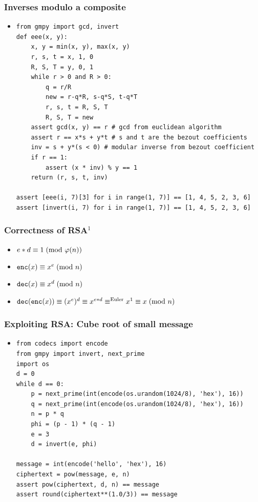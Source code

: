 \documentclass{beamer}
\begin{document}
\begin{frame}[fragile]
\frametitle{Inverses modulo a composite}
\begin{itemize}
\item \begin{Verbatim}[fontsize=\scriptsize]
from gmpy import gcd, invert
def eee(x, y):
    x, y = min(x, y), max(x, y)
    r, s, t = x, 1, 0
    R, S, T = y, 0, 1
    while r > 0 and R > 0:
        q = r/R
        new = r-q*R, s-q*S, t-q*T
        r, s, t = R, S, T
        R, S, T = new
    assert gcd(x, y) == r # gcd from euclidean algorithm
    assert r == x*s + y*t # s and t are the bezout coefficients
    inv = s + y*(s < 0) # modular inverse from bezout coefficient
    if r == 1:
        assert (x * inv) % y == 1
    return (r, s, t, inv)

assert [eee(i, 7)[3] for i in range(1, 7)] == [1, 4, 5, 2, 3, 6]
assert [invert(i, 7) for i in range(1, 7)] == [1, 4, 5, 2, 3, 6]
\end{Verbatim}
\end{itemize}
\end{frame}

\begin{frame}[fragile]
\frametitle{Correctness of RSA$^{1}$}
\begin{itemize}
\item $e * d \equiv 1\hspace{1mm}(\text{mod } \varphi(n))$
\item $\verb|enc|(x) \equiv x^e\hspace{1mm}(\text{mod }n)$
\item $\verb|dec|(x) \equiv x^d\hspace{1mm}(\text{mod }n)$
\item $\verb|dec|(\verb|enc|(x)) \equiv (x^e)^d \equiv x^{e*d} \equiv^{\text{Euler}} x^1 \equiv x \hspace{1mm}(\text{mod }n)$
\end{itemize}
\end{frame}

\begin{frame}[fragile]
\frametitle{Exploiting RSA: Cube root of small message}
\begin{itemize}
\item
\begin{Verbatim}[fontsize=\scriptsize]
from codecs import encode
from gmpy import invert, next_prime
import os
d = 0
while d == 0:
    p = next_prime(int(encode(os.urandom(1024/8), 'hex'), 16))
    q = next_prime(int(encode(os.urandom(1024/8), 'hex'), 16))
    n = p * q
    phi = (p - 1) * (q - 1)
    e = 3
    d = invert(e, phi)

message = int(encode('hello', 'hex'), 16)
ciphertext = pow(message, e, n)
assert pow(ciphertext, d, n) == message
assert round(ciphertext**(1.0/3)) == message
\end{Verbatim}
\end{itemize}
\end{frame}
\end{document}
